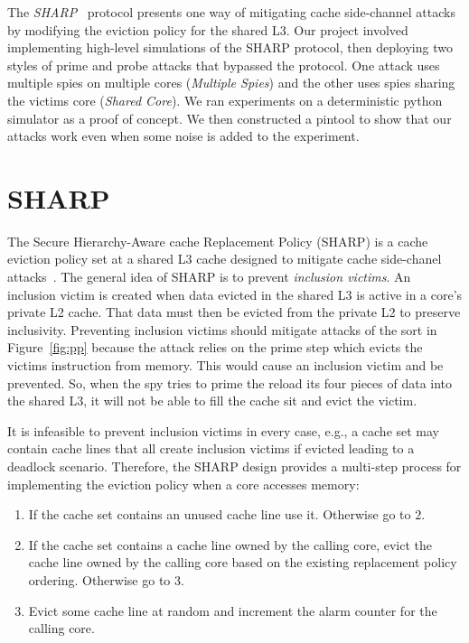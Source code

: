 \documentclass[12pt]{article}
\begin{document}
The {\it SHARP}~\cite{sharp} protocol presents one way of mitigating cache side-channel attacks by modifying the eviction policy for the shared L3.
Our project involved implementing high-level simulations of the SHARP protocol, 
then deploying two styles of prime and probe attacks that bypassed the protocol.
One attack uses multiple spies on multiple cores ({\it Multiple Spies}) and the other uses spies sharing the victims core ({\it Shared Core}).
We ran experiments on a deterministic python simulator as a proof of concept.
We then constructed a pintool to show that our attacks work even when some noise is added to the experiment.


\section{SHARP}

The Secure Hierarchy-Aware cache Replacement Policy (SHARP) is a cache eviction policy set at a shared L3 cache designed to mitigate cache side-chanel attacks~\cite{sharp}.
The general idea of SHARP is to prevent {\it inclusion victims}.
An inclusion victim is created when data evicted in the shared L3 is active in a core's private L2 cache.
That data must then be evicted from the private L2 to preserve inclusivity.
Preventing inclusion victims should mitigate attacks of the sort in Figure~\ref{fig:pp} because the attack relies on the prime step which evicts the victims instruction from memory.
This would cause an inclusion victim and be prevented.
So, when the spy tries to prime the reload its four pieces of data into the shared L3,
it will not be able to fill the cache sit and evict the victim.

It is infeasible to prevent inclusion victims in every case, e.g., a cache set may contain cache lines that all create inclusion victims if evicted leading to a deadlock scenario.
Therefore, the SHARP design provides a multi-step process for implementing the eviction policy when a core accesses memory:

\begin{enumerate}

\item If the cache set contains an unused cache line use it. Otherwise go to $2$.
\item If the cache set contains a cache line owned by the calling core, evict the cache line owned by the calling core based on the existing replacement policy ordering. Otherwise go to $3$.
\item Evict some cache line at random and increment the alarm counter for the calling core.

\end{enumerate}
\end{document}
